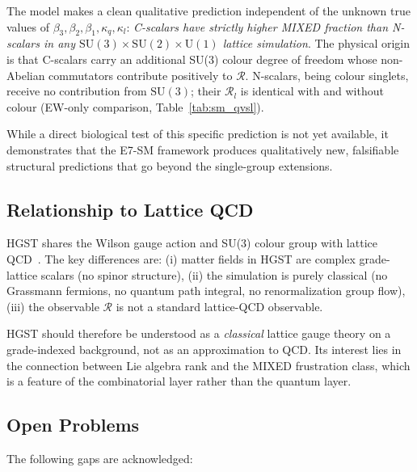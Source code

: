 \documentclass[12pt,a4paper]{article}
\newcommand{\R}{\mathcal{R}}           %
\newcommand{\SU}[1]{\mathrm{SU}(#1)}
\newcommand{\UN}[1]{\mathrm{U}(#1)}
\newcommand{\SM}{\SU{3}\!\times\!\SU{2}\!\times\!\UN{1}}
\theoremstyle{plain}
\theoremstyle{definition}
\theoremstyle{remark}
\begin{document}
The model makes a clean qualitative prediction independent of the unknown true values
of $\beta_3,\beta_2,\beta_1,\kappa_q,\kappa_l$: \emph{C-scalars have strictly higher
MIXED fraction than N-scalars in any $\SM$ lattice simulation}.
The physical origin is that C-scalars carry an additional SU(3) colour degree of freedom
whose non-Abelian commutators contribute positively to $\R$.
N-scalars, being colour singlets, receive no contribution from $\SU{3}$; their $\R_l$
is identical with and without colour (EW-only comparison, Table~\ref{tab:sm_qvsl}).

While a direct biological test of this specific prediction is not yet available,
it demonstrates that the E7-SM framework produces qualitatively new, falsifiable
structural predictions that go beyond the single-group extensions.

\subsection{Relationship to Lattice QCD}

HGST shares the Wilson gauge action and SU(3) colour group with lattice
QCD~\citep{Wilson1974,Montvay1994}.
The key differences are:
(i) matter fields in HGST are complex grade-lattice scalars (no spinor structure),
(ii) the simulation is purely classical (no Grassmann fermions, no quantum path
integral, no renormalization group flow),
(iii) the observable $\R$ is not a standard lattice-QCD observable.

HGST should therefore be understood as a \emph{classical} lattice gauge theory on a
grade-indexed background, not as an approximation to QCD.
Its interest lies in the connection between Lie algebra rank and the MIXED
frustration class, which is a feature of the combinatorial layer rather than the
quantum layer.

\subsection{Open Problems}

The following gaps are acknowledged:
\end{document}
